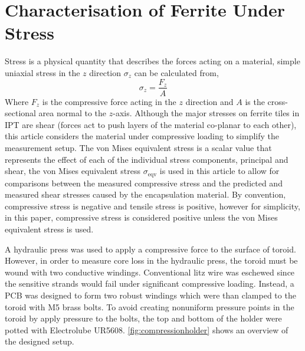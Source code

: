 \documentclass[conference]{IEEEtran}
\begin{document}
\section{Characterisation of Ferrite Under Stress}
Stress is a physical quantity that describes the forces acting on a material, simple uniaxial stress in the $z$ direction $\sigma_z$ can be calculated from, 
\begin{equation}
  \sigma_z = \frac{F_z}{A}
\end{equation}
Where $F_z$ is the compressive force acting in the $z$ direction and $A$ is the cross-sectional area normal to the $z$-axis. 
Although the major stresses on ferrite tiles in IPT are shear (forces act to push layers of the material co-planar to each other), this article considers the material under compressive loading to simplify the measurement setup. 
The von Mises equivalent stress is a scalar value that represents the effect of each of the individual stress components, principal and shear, the von Mises equivalent stress $\sigma_\text{eqv}$ is used in this article to allow for comparisons between the measured compressive stress and the predicted and measured shear stresses caused by the encapsulation material. 
By convention, compressive stress is negative and tensile stress is positive, however for simplicity, in this paper, compressive stress is considered positive unless the von Mises equivalent stress is used. 

A hydraulic press was used to apply a compressive force to the surface of toroid. 
However, in order to measure core loss in the hydraulic press, the toroid must be wound with two conductive windings. 
Conventional litz wire was eschewed since the sensitive strands would fail under significant compressive loading. 
Instead, a PCB was designed to form two robust windings which were than clamped to the toroid with M5 brass bolts. 
To avoid creating nonuniform pressure points in the toroid by apply pressure to the bolts, the top and bottom of the holder were potted with Electrolube UR5608. 
\cref{fig:compressionholder} shows an overview of the designed setup. 
\end{document}
